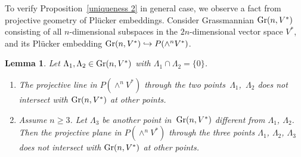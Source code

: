 \documentclass[11pt]{article}
\newtheorem{Lem}[Th]{Lemma}
{ \theoremstyle{definition}
\newtheorem{Def}[Th]{Definition}
\newtheorem{Rem}[Th]{Remark}
\newtheorem{Ex}[Th]{Example}}
\begin{document}
To verify Proposition~\ref{uniqueness 2} in general case,
we observe a fact from projective geometry of Pl\"{u}cker embeddings.
Consider Grassmannian ${\rm Gr}(n, V^*)$ consisting of all
$n$-dimensional subspaces
in the $2n$-dimensional vector space $V^*$, and its
Pl\"{u}cker embedding ${\rm Gr}(n, V^*) \hookrightarrow P(\wedge^{n} V^*)$.

\begin{Lem}
\label{proj.geom}
Let $\Lambda_1, \Lambda_2 \in {\rm Gr}(n, V^*)$ with $\Lambda_1 \cap \Lambda_2 = \{ 0\}$.
\begin{enumerate}\itemsep=0pt
\item[$(1)$] The projective line in $P(\wedge^{n} V^*)$
through the two points~$\Lambda_1$,~$\Lambda_2$ does not intersect
with ${\rm Gr}(n, V^*)$ at other points.

\item[$(2)$] Assume $n \geq 3$. Let $\Lambda_3$ be another point in~${\rm Gr}(n, V^*)$
different from $\Lambda_1$, $\Lambda_2$. Then the projective plane
in $P(\wedge^{n} V^*)$ through the three points $\Lambda_1$, $\Lambda_2$,
$\Lambda_3$
does not intersect with ${\rm Gr}(n, V^*)$ at other points.
\end{enumerate}
\end{Lem}
\end{document}

